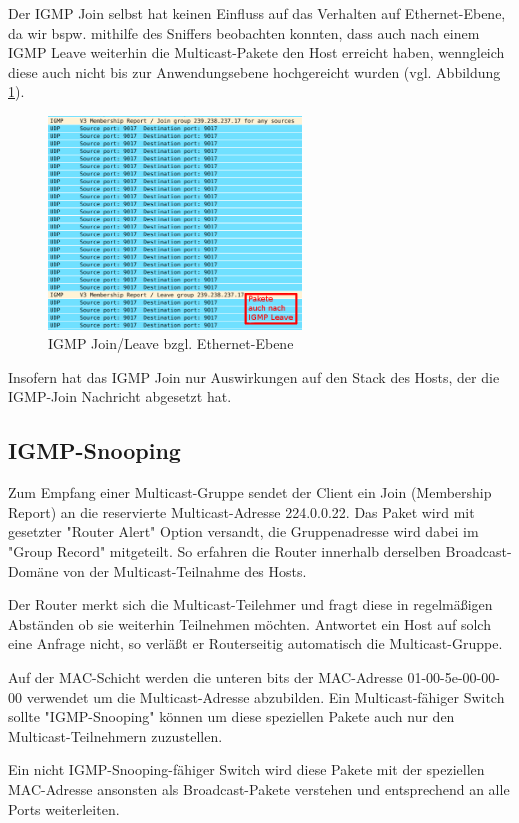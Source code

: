 \documentclass[a4paper,10pt]{article}
\begin{document}
Der IGMP Join selbst hat keinen Einfluss auf das Verhalten auf Ethernet-Ebene,
da wir bspw. mithilfe des Sniffers beobachten konnten, 
dass auch nach einem IGMP Leave weiterhin die Multicast-Pakete den Host erreicht haben,
wenngleich diese auch nicht bis zur Anwendungsebene hochgereicht wurden (vgl. Abbildung \ref{multicast_after_leave}).

\begin{figure}[h]
	\begin{center}
		\includegraphics[width=0.6\textwidth]{multicast_after_leave.png}
	\end{center}

	\caption{IGMP Join/Leave bzgl. Ethernet-Ebene}

	\label{multicast_after_leave}
\end{figure}

Insofern hat das IGMP Join nur Auswirkungen auf den Stack des Hosts, 
der die IGMP-Join Nachricht abgesetzt hat.

\subsection{IGMP-Snooping}

Zum Empfang einer Multicast-Gruppe sendet der Client ein Join (Membership Report) an die reservierte Multicast-Adresse 224.0.0.22. Das Paket wird mit gesetzter "Router Alert" Option versandt, die Gruppenadresse wird dabei im "Group Record" mitgeteilt. So erfahren die Router innerhalb derselben Broadcast-Domäne von der Multicast-Teilnahme des Hosts.

Der Router merkt sich die Multicast-Teilehmer und fragt diese in regelmäßigen Abständen ob sie weiterhin Teilnehmen möchten. Antwortet ein Host auf solch eine Anfrage nicht, so verläßt er Routerseitig automatisch die Multicast-Gruppe.

Auf der MAC-Schicht werden die unteren bits der MAC-Adresse 01-00-5e-00-00-00 verwendet um 
die Multicast-Adresse abzubilden. Ein Multicast-fähiger Switch sollte "IGMP-Snooping" können um diese speziellen Pakete auch nur den Multicast-Teilnehmern zuzustellen.

Ein nicht IGMP-Snooping-fähiger Switch wird diese Pakete mit der speziellen MAC-Adresse
ansonsten als Broadcast-Pakete verstehen und entsprechend an alle Ports weiterleiten.
\end{document}

